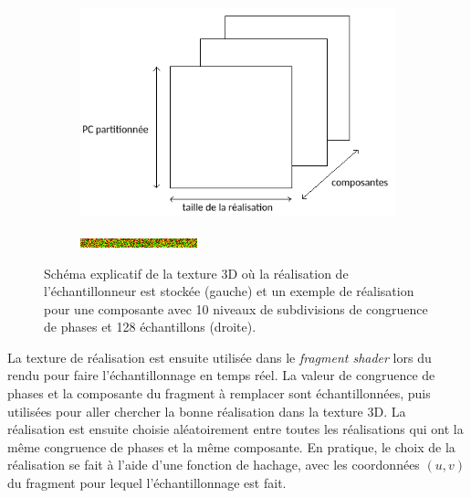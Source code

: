 \begin{figure}
    \centering
    \begin{subfigure}{.5\textwidth}
        \centering
        \includegraphics[width=\textwidth]{contenu/resources/images/sampler_realization}
    \end{subfigure}
    \hfill
    \begin{subfigure}{.45\textwidth}
        \centering
        \includegraphics[width=\textwidth]{contenu/resources/images/realization_pc_0}
    \end{subfigure}

    \caption[Réalisation de l'échantillonneur préférentiel]{Schéma explicatif de la texture 3D où la réalisation de l'échantillonneur est stockée (gauche) et un exemple de réalisation pour une composante avec 10 niveaux de subdivisions de congruence de phases et 128 échantillons (droite).}
    \label{fig:sampler-realization}
\end{figure}

La texture de réalisation est ensuite utilisée dans le \textit{fragment shader} lors du rendu pour faire l'échantillonnage en temps réel. La valeur de congruence de phases et la composante du fragment à remplacer sont échantillonnées, puis utilisées pour aller chercher la bonne réalisation dans la texture 3D. La réalisation est ensuite choisie aléatoirement entre toutes les réalisations qui ont la même congruence de phases et la même composante. En pratique, le choix de la réalisation se fait à l'aide d'une fonction de hachage, avec les coordonnées $(u, v)$ du fragment pour lequel l'échantillonnage est fait.

